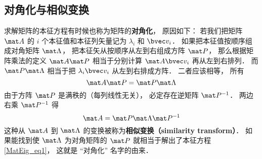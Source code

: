 \subsection{对角化与相似变换}
求解矩阵的本征方程有时候也称为矩阵的\textbf{对角化}， 原因如下： 若我们把矩阵 $\mat A$ 的 $i$ 个本征值和本征列矢量记为 $\lambda_i$ 和 $\bvec v_i$． 如果把本征值按顺序组成对角矩阵 $\mat \Lambda$， 把本征矢从按顺序从左到右组成方阵 $\mat P$， 那么根据矩阵乘法的定义 $\mat A \mat P$ 相当于分别计算 $\mat A\bvec v_i$ 再从左到右排列． 而 $\mat P\mat\Lambda$ 相当于把 $\lambda_i\bvec v_i$ 从左到右排成方阵． 二者应该相等， 所有
\begin{equation}
\mat A \mat P = \mat P\mat\Lambda
\end{equation}
由于方阵 $\mat P$ 是满秩的（每列线性无关）， 必定存在逆矩阵%
$\mat P^{-1}$． 两边右乘 $\mat P^{-1}$ 得
\begin{equation}\label{MatEig_eq3}
\mat A = \mat P\mat\Lambda\mat P^{-1}
\end{equation}
这种从 $\mat A$ 到 $\mat\Lambda$ 的变换被称为\textbf{相似变换（similarity transform）}． 如果能找到使 $\mat\Lambda$ 为对角矩阵的 $\mat P$ 就相当于解出了本征方程\autoref{MatEig_eq1}， 这就是 “对角化” 名字的由来．
